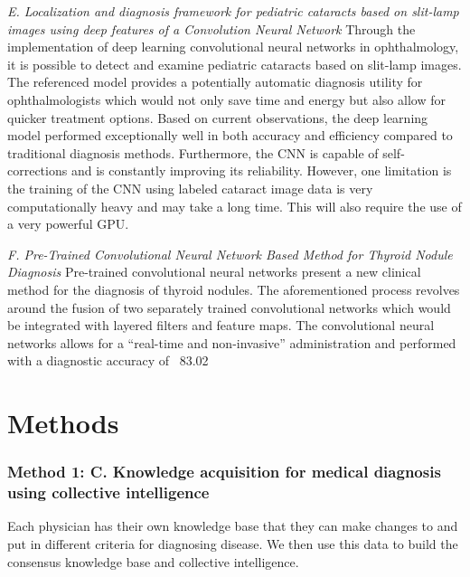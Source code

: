 \documentclass[conference]{IEEEtran}
\begin{document}
\textit{E. Localization and diagnosis framework for pediatric cataracts based on slit-lamp images using deep features of a Convolution Neural Network }
Through the implementation of deep learning convolutional neural networks in ophthalmology, it is possible to detect and examine pediatric cataracts based on slit-lamp images. The referenced model provides a potentially automatic diagnosis utility for ophthalmologists which would not only save time and energy but also allow for quicker treatment options. Based on current observations, the deep learning model performed exceptionally well in both accuracy and efficiency compared to traditional diagnosis methods. Furthermore, the CNN is capable of self-corrections and is constantly improving its reliability. However, one limitation is the training of the CNN using labeled cataract image data is very computationally heavy and may take a long time. This will also require the use of a very powerful GPU.

\textit{F. Pre-Trained Convolutional Neural Network Based Method for Thyroid Nodule Diagnosis}
Pre-trained convolutional neural networks present a new clinical method for the diagnosis of thyroid nodules. The aforementioned process revolves around the fusion of two separately trained convolutional networks which would be integrated with layered filters and feature maps. The convolutional neural networks allows for a “real-time and non-invasive” administration and performed with a diagnostic accuracy of ~83.02%

\section{Methods}


\subsubsection{Method 1: C. Knowledge acquisition for medical diagnosis using collective intelligence }

	Each physician has their own knowledge base that they can make changes to and put in different criteria for diagnosing disease. We then use this data to build the consensus knowledge base and collective intelligence.
\end{document}
